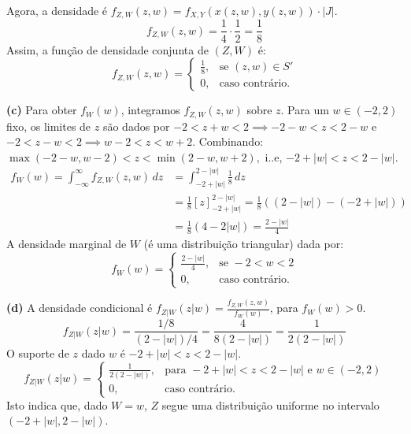 {	Agora, a densidade é $f_{Z,W}(z,w) = f_{X,Y}(x(z,w), y(z,w)) \cdot |J|$.
	$$ f_{Z,W}(z,w) = \frac{1}{4} \cdot \frac{1}{2} = \frac{1}{8} $$
	Assim, a função de densidade conjunta de $(Z,W)$ é:
	$$ f_{Z,W}(z,w) = 
	\begin{cases}
		\frac{1}{8}, & \text{se } (z,w) \in S' \\
		0, &  \text{caso contrário.}
	\end{cases}
	$$
	
 {\bf (c)} 
	Para obter $f_W(w)$, integramos $f_{Z,W}(z,w)$ sobre $z$. Para um $w \in (-2,2)$ fixo, os limites de $z$ são dados por $-2 < z+w < 2 \implies -2-w < z < 2-w$ e $-2 < z-w < 2 \implies w-2 < z < w+2$. Combinando: $\max(-2-w, w-2) < z < \min(2-w, w+2),$ i..e, $-2+|w| < z < 2-|w|$.
	\begin{align*}
		f_W(w) = \int_{-\infty}^{\infty} f_{Z,W}(z,w) \,dz &= \int_{-2+|w|}^{2-|w|} \frac{1}{8} \,dz \\
		&= \frac{1}{8} [z]_{-2+|w|}^{2-|w|} = \frac{1}{8} \left( (2-|w|) - (-2+|w|) \right) \\
		&= \frac{1}{8} (4 - 2|w|) = \frac{2-|w|}{4}
	\end{align*}
	A densidade marginal de $W$ (é uma distribuição triangular) dada por:
	$$ f_W(w) = 
	\begin{cases}
		\frac{2-|w|}{4}, & \text{se } -2 < w < 2 \\
		0, &  \text{caso contrário.}
	\end{cases}
	$$
	
	{\bf (d)} 
	A densidade condicional é $f_{Z|W}(z|w) = \frac{f_{Z,W}(z,w)}{f_W(w)}$, para $f_W(w)>0$.
	$$
	f_{Z|W}(z|w) = \frac{1/8}{(2-|w|)/4} = \frac{4}{8(2-|w|)} = \frac{1}{2(2-|w|)}
	$$
	O suporte de $z$ dado $w$ é $-2+|w| < z < 2-|w|$.
	$$
	f_{Z|W}(z|w) = 
	\begin{cases}
		\frac{1}{2(2-|w|)}, & \text{para } -2+|w| < z < 2-|w| \text{ e } w \in (-2,2) \\
		0, &  \text{caso contrário.}
	\end{cases}
	$$
	Isto indica que, dado $W=w$, $Z$ segue uma distribuição uniforme no intervalo $(-2+|w|, 2-|w|)$.
	


}



%
%






